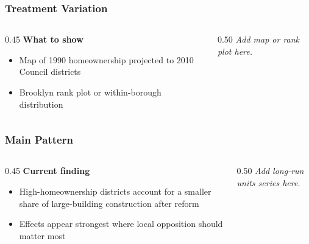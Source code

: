
\begin{frame}
    \frametitle{Treatment Variation}

    \begin{columns}[T]
    \begin{column}{0.45\textwidth}
        \textbf{What to show}
        \begin{itemize}
            \item Map of 1990 homeownership projected to 2010 Council districts
            \item Brooklyn rank plot or within-borough distribution
        \end{itemize}
    \end{column}
    \begin{column}{0.50\textwidth}
        \centering
        \vspace{1.5em}
        \textit{Add map or rank plot here.}
    \end{column}
    \end{columns}
\end{frame}

\begin{frame}
    \frametitle{Main Pattern}

    \begin{columns}[T]
    \begin{column}{0.45\textwidth}
        \textbf{Current finding}
        \begin{itemize}
            \item High-homeownership districts account for a smaller share of large-building construction after reform
            \item Effects appear strongest where local opposition should matter most
        \end{itemize}
    \end{column}
    \begin{column}{0.50\textwidth}
        \centering
        \vspace{1.5em}
        \textit{Add long-run units series here.}
    \end{column}
    \end{columns}
\end{frame}

